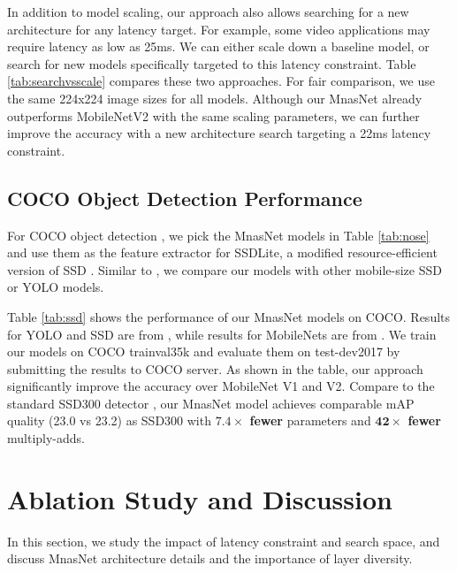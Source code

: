 \documentclass[10pt,twocolumn,letterpaper]{article}
\begin{document}
In addition to model scaling, our approach also allows searching for a new architecture for any latency target. For example, some video applications may require latency as low as 25ms. We can either scale down a baseline model, or search for new models specifically targeted to this latency constraint. Table \ref{tab:searchvsscale} compares these two approaches. For fair comparison,  we use the same 224x224 image sizes for all models. Although our MnasNet already outperforms MobileNetV2 with the same scaling parameters, we can further improve the accuracy with a new architecture search targeting a 22ms latency constraint.

\subsection{COCO Object Detection Performance}

For COCO object detection \cite{coco14}, we pick the MnasNet models in Table \ref{tab:nose} and use them as the feature extractor for SSDLite, a modified resource-efficient version of SSD \cite{mobilenetv218}.  Similar to \cite{mobilenetv218}, we compare our models with other mobile-size SSD or YOLO  models.

Table \ref{tab:ssd} shows the performance of our MnasNet models on COCO. Results for YOLO and SSD are from \cite{yolo17}, while results for MobileNets are from \cite{mobilenetv218}. We train our  models on COCO trainval35k and evaluate them on test-dev2017 by submitting the results to COCO server. As shown in the table, our approach significantly improve the accuracy over MobileNet V1 and V2. Compare to the standard SSD300 detector \cite{ssd16}, our MnasNet model achieves comparable mAP quality (23.0 vs 23.2) as SSD300  with \textbf{$\mathbf{7.4\times}$ fewer} parameters and \textbf{$\mathbf{42\times}$ fewer} multiply-adds.


\section{Ablation Study and Discussion}

In this section, we study the impact of latency constraint and search space, and discuss MnasNet architecture details and the importance of layer diversity.
\end{document}
